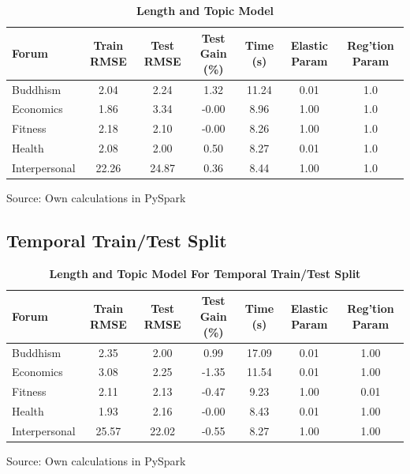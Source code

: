 \documentclass[11pt,preprint, authoryear]{article}
\numberwithin{equation}{section}
\begin{document}
\begin{longtable}[htbp] {@{} lcccccc @{}} 
\caption{\textbf{Length and Topic Model}} 
\label{tab:rand_final_model} \\
\toprule
\textbf{Forum} &  \textbf{Train RMSE} &  \textbf{Test RMSE} &  \textbf{Test Gain (\%)} &  \textbf{Time (s)} & \textbf{Elastic Param} &  \textbf{Reg'tion Param} \\
\midrule
Buddhism      &             2.04 &          2.24 &           1.32 &          11.24 &             0.01 &              1.0 \\
Economics     &             1.86 &          3.34 &          -0.00 &           8.96 &             1.00 &              1.0 \\
Fitness       &             2.18 &          2.10 &          -0.00 &           8.26 &             1.00 &              1.0 \\
Health        &             2.08 &          2.00 &           0.50 &           8.27 &             0.01 &              1.0 \\
Interpersonal &            22.26 &         24.87 &           0.36 &           8.44 &             1.00 &              1.0 \\
\bottomrule
\end{longtable}\begin{center} Source: Own calculations in PySpark\end{center}

\normalsize

\subsection{Temporal Train/Test Split}\label{temporal-traintest-split}

\footnotesize

\begin{longtable}[htbp] {@{} lcccccc @{}} 
\caption{\textbf{Length and Topic Model For Temporal Train/Test Split}} 
\label{tab:time_token_model} \\
\toprule
\textbf{Forum} &  \textbf{Train RMSE} &  \textbf{Test RMSE} &  \textbf{Test Gain (\%)} &  \textbf{Time (s)} & \textbf{Elastic Param} &  \textbf{Reg'tion Param} \\
\midrule
Buddhism      &             2.35 &          2.00 &           0.99 &          17.09 &             0.01 &             1.00 \\
Economics     &             3.08 &          2.25 &          -1.35 &          11.54 &             0.01 &             1.00 \\
Fitness       &             2.11 &          2.13 &          -0.47 &           9.23 &             1.00 &             0.01 \\
Health        &             1.93 &          2.16 &          -0.00 &           8.43 &             0.01 &             1.00 \\
Interpersonal &            25.57 &         22.02 &          -0.55 &           8.27 &             1.00 &             1.00 \\
\bottomrule
\end{longtable}\begin{center} Source: Own calculations in PySpark\end{center}
\end{document}
